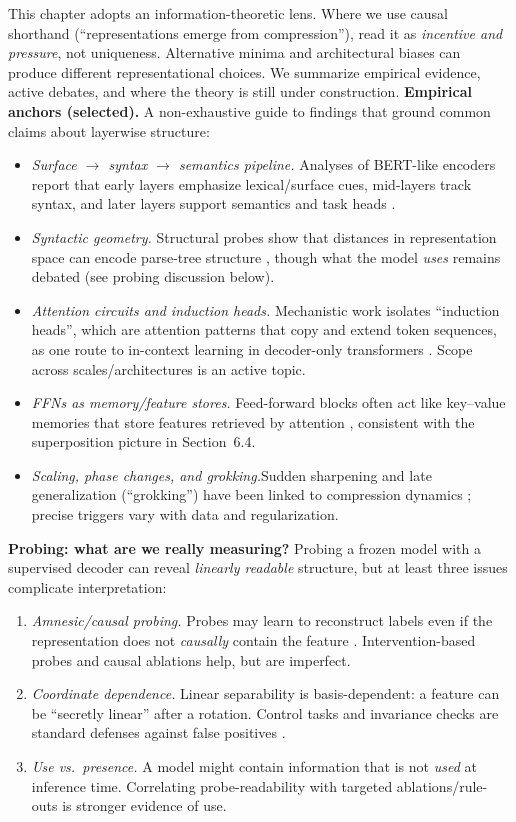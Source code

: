This chapter adopts an information-theoretic lens. Where we use causal shorthand (``representations emerge from compression''), read it as \emph{incentive and pressure}, not uniqueness. Alternative minima and architectural biases can produce different representational choices. We summarize empirical evidence, active debates, and where the theory is still under construction.
\textbf{Empirical anchors (selected).}
A non-exhaustive guide to findings that ground common claims about layerwise structure:
\begin{itemize}
\item \emph{Surface $\rightarrow$ syntax $\rightarrow$ semantics pipeline.} Analyses of BERT-like encoders report that early layers emphasize lexical/surface cues, mid-layers track syntax, and later layers support semantics and task heads \citep{tenney2019pipeline,jawahar2019structure,rogers2020bertology}.
\item \emph{Syntactic geometry.} Structural probes show that distances in representation space can encode parse-tree structure \citep{hewitt2019structural}, though what the model \emph{uses} remains debated (see probing discussion below).
\item \emph{Attention circuits and induction heads.} Mechanistic work isolates ``induction heads'', which are attention patterns that copy and extend token sequences, as one route to in-context learning in decoder-only transformers \citep{elhage2021circuits,olsson2022icl}. Scope across scales/architectures is an active topic.
\item \emph{FFNs as memory/feature stores.} Feed-forward blocks often act like key--value memories that store features retrieved by attention \citep{geva2021kv}, consistent with the superposition picture in Section~6.4.
\item \emph{Scaling, phase changes, and grokking.}\newline Sudden sharpening and late generalization (``grokking'') have been linked to compression dynamics \citep{power2022grokking}; precise triggers vary with data and regularization.
\end{itemize}
\textbf{Probing: what are we really measuring?}
Probing a frozen model with a supervised decoder can reveal \emph{linearly readable} structure, but at least three issues complicate interpretation:
\begin{enumerate}
\item \emph{Amnesic/causal probing.} Probes may learn to reconstruct labels even if the representation does not \emph{causally} contain the feature \citep{ravichander2020probes}. Intervention-based probes and causal ablations help, but are imperfect.
\item \emph{Coordinate dependence.} Linear separability is basis-dependent: a feature can be ``secretly linear'' after a rotation. Control tasks and invariance checks are standard defenses against false positives \citep{belinkov2019survey}.
\item \emph{Use vs.\ presence.} A model might contain information that is not \emph{used} at inference time. Correlating probe-readability with targeted ablations/rule-outs is stronger evidence of use.
\end{enumerate}
